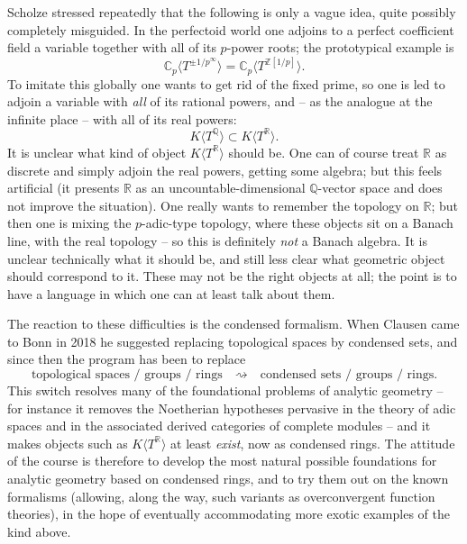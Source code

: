 \begin{remark}
\label{rmk:2:global-perfectoid}
Scholze stressed repeatedly that the following is only a vague idea, quite
possibly completely misguided. In the perfectoid world one adjoins to a perfect
coefficient field a variable together with all of its $p$-power roots; the
prototypical example is
\begin{equation*}
\mathbb{C}_p\bigl\langle T^{\pm 1/p^{\infty}}\bigr\rangle
=\mathbb{C}_p\bigl\langle T^{\mathbb{Z}[1/p]}\bigr\rangle .
\end{equation*}
To imitate this globally one wants to get rid of the fixed prime, so one is led
to adjoin a variable with \emph{all} of its rational powers, and -- as the
analogue at the infinite place -- with all of its real powers:
\begin{equation}
\label{eq:2:global-idea}
K\bigl\langle T^{\mathbb{Q}}\bigr\rangle
\subset
K\bigl\langle T^{\mathbb{R}}\bigr\rangle .
\end{equation}
It is unclear what kind of object $K\langle T^{\mathbb{R}}\rangle$ should be. One
can of course treat $\mathbb{R}$ as discrete and simply adjoin the real powers,
getting some algebra; but this feels artificial (it presents $\mathbb{R}$ as an
uncountable-dimensional $\mathbb{Q}$-vector space and does not improve the
situation). One really wants to remember the topology on $\mathbb{R}$; but then
one is mixing the $p$-adic-type topology, where these objects sit on a Banach
line, with the real topology -- so this is definitely \emph{not} a Banach
algebra. It is unclear technically what it should be, and still less clear what
geometric object should correspond to it. These may not be the right objects at
all; the point is to have a language in which one can at least talk about them.
\end{remark}

The reaction to these difficulties is the condensed formalism. When Clausen came
to Bonn in 2018 he suggested replacing topological spaces by condensed sets, and
since then the program has been to replace
\[
\text{topological spaces / groups / rings}
\quad\rightsquigarrow\quad
\text{condensed sets / groups / rings.}
\]
This switch resolves many of the foundational problems of analytic geometry --
for instance it removes the Noetherian hypotheses pervasive in the theory of
adic spaces and in the associated derived categories of complete modules -- and
it makes objects such as $K\langle T^{\mathbb{R}}\rangle$ at least \emph{exist},
now as condensed rings. The attitude of the course is therefore to develop the
most natural possible foundations for analytic geometry based on condensed rings,
and to try them out on the known formalisms (allowing, along the way, such
variants as overconvergent function theories), in the hope of eventually
accommodating more exotic examples of the kind above.

